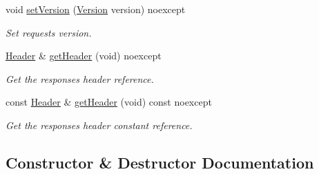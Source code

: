 \begin{DoxyCompactItemize}
void \mbox{\hyperlink{classo_z_1_1_h_t_t_p_1_1_request_a478b88fb4a88f9d0489b408162005b61}{set\+Version}} (\mbox{\hyperlink{structo_z_1_1_h_t_t_p_1_1_version}{Version}} version) noexcept
\begin{DoxyCompactList}\small\item\em Set request\textquotesingle{}s version. \end{DoxyCompactList}\item 
\mbox{\hyperlink{classo_z_1_1_h_t_t_p_1_1_header}{Header}} \& \mbox{\hyperlink{classo_z_1_1_h_t_t_p_1_1_request_a8be8c50762b4faacfbec6f671233fb87}{get\+Header}} (void) noexcept
\begin{DoxyCompactList}\small\item\em Get the response\textquotesingle{}s header reference. \end{DoxyCompactList}\item 
const \mbox{\hyperlink{classo_z_1_1_h_t_t_p_1_1_header}{Header}} \& \mbox{\hyperlink{classo_z_1_1_h_t_t_p_1_1_request_af30ec4512061e7953483954f90cba215}{get\+Header}} (void) const noexcept
\begin{DoxyCompactList}\small\item\em Get the response\textquotesingle{}s header constant reference. \end{DoxyCompactList}\end{DoxyCompactItemize}


\subsection{Constructor \& Destructor Documentation}
\mbox{\label{classo_z_1_1_h_t_t_p_1_1_request_acc69cd33d01a659ec94ae669cdbdba2a}} 
